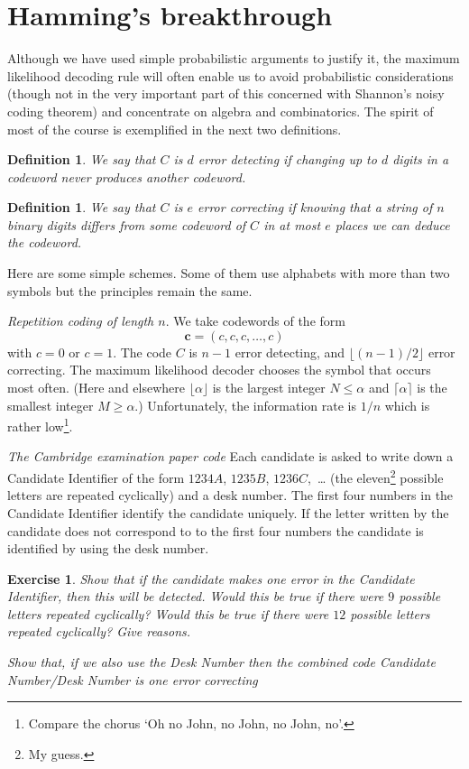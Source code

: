 \documentclass[12pt,a4paper]{article}
\theoremstyle{plain}
\newtheorem{definition}[theorem]{Definition}
\newtheorem{exercise}[theorem]{Exercise}
\theoremstyle{definition}
\begin{document}
\section{Hamming's breakthrough}
Although we have used simple probabilistic arguments
to justify it, the maximum likelihood decoding rule
will often enable us to avoid probabilistic considerations
(though not in the very important part of this concerned with
Shannon's noisy coding theorem) and concentrate on
algebra and combinatorics.
The spirit of most of the course is exemplified in the
next two definitions.
\begin{definition} We say that $C$ is $d$ \emph{error detecting}
if changing up to $d$ digits in a codeword never produces
another codeword.
\end{definition}
\begin{definition} We say that $C$ is $e$
\emph{error correcting}
if knowing that a string of $n$ binary digits differs
from some codeword of $C$ in at most
$e$ places we can deduce the codeword.
\end{definition}

Here are some simple schemes. Some of them use alphabets with
more than two symbols but the principles remain the same.

\noindent\emph{Repetition coding of length $n$}.
We take codewords of the form
\[{\mathbf c}=(c,c,c,\dots,c)\]
with $c=0$ or $c=1$. The code $C$ is $n-1$ error detecting,
and $\lfloor (n-1)/2\rfloor$ error correcting.
The maximum likelihood decoder chooses the
symbol that occurs most often.
(Here and elsewhere $\lfloor \alpha\rfloor$ is the largest
integer $N\leq\alpha$ and $\lceil \alpha \rceil$ is
the smallest integer $M\geq\alpha$.) Unfortunately,
the information rate is $1/n$ which is
rather low\footnote{Compare
the chorus `Oh no John, no John, no John, no'.}.

\noindent\emph{The Cambridge examination paper code}
Each candidate is asked to write down a Candidate Identifier of the
form 
$1234A$, $1235B$, $1236C$,\ \dots 
(the eleven\footnote{My guess.} possible letters are repeated cyclically)
and a desk number. The first four numbers
in the Candidate Identifier  identify the candidate
uniquely. If the letter written by the
candidate does not correspond to
to the first four numbers the candidate is identified
by using the desk number.
\begin{exercise}\label{E;Cambridge exam} 
Show that if the candidate makes one error
in the Candidate Identifier,
then this will be detected.
Would this be true if there were $9$ possible
letters repeated cyclically? Would this be true
if there were $12$ possible
letters repeated cyclically?
Give reasons.

Show that, if we also use the Desk Number
then the combined code Candidate Number/Desk Number 
is one error correcting
\end{exercise}
\end{document}
